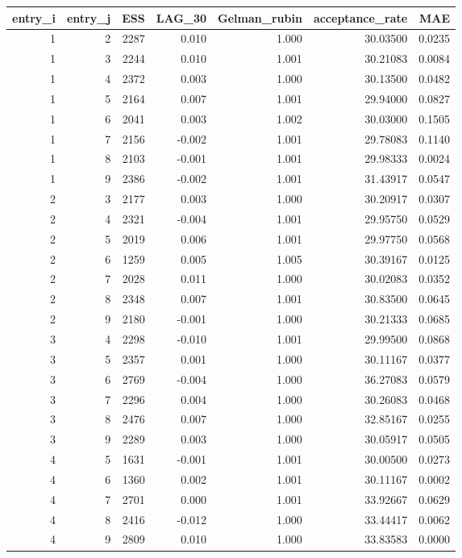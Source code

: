\begin{longtable}{rrrrrrr}
\toprule
entry\_i & entry\_j & ESS & LAG\_30 & Gelman\_rubin & acceptance\_rate & MAE \\ 
\midrule
1 & 2 & 2287 & 0.010 & 1.000 & 30.03500 & 0.0235 \\ 
1 & 3 & 2244 & 0.010 & 1.001 & 30.21083 & 0.0084 \\ 
1 & 4 & 2372 & 0.003 & 1.000 & 30.13500 & 0.0482 \\ 
1 & 5 & 2164 & 0.007 & 1.001 & 29.94000 & 0.0827 \\ 
1 & 6 & 2041 & 0.003 & 1.002 & 30.03000 & 0.1505 \\ 
1 & 7 & 2156 & -0.002 & 1.001 & 29.78083 & 0.1140 \\ 
1 & 8 & 2103 & -0.001 & 1.001 & 29.98333 & 0.0024 \\ 
1 & 9 & 2386 & -0.002 & 1.001 & 31.43917 & 0.0547 \\ 
2 & 3 & 2177 & 0.003 & 1.000 & 30.20917 & 0.0307 \\ 
2 & 4 & 2321 & -0.004 & 1.001 & 29.95750 & 0.0529 \\ 
2 & 5 & 2019 & 0.006 & 1.001 & 29.97750 & 0.0568 \\ 
2 & 6 & 1259 & 0.005 & 1.005 & 30.39167 & 0.0125 \\ 
2 & 7 & 2028 & 0.011 & 1.000 & 30.02083 & 0.0352 \\ 
2 & 8 & 2348 & 0.007 & 1.001 & 30.83500 & 0.0645 \\ 
2 & 9 & 2180 & -0.001 & 1.000 & 30.21333 & 0.0685 \\ 
3 & 4 & 2298 & -0.010 & 1.001 & 29.99500 & 0.0868 \\ 
3 & 5 & 2357 & 0.001 & 1.000 & 30.11167 & 0.0377 \\ 
3 & 6 & 2769 & -0.004 & 1.000 & 36.27083 & 0.0579 \\ 
3 & 7 & 2296 & 0.004 & 1.000 & 30.26083 & 0.0468 \\ 
3 & 8 & 2476 & 0.007 & 1.000 & 32.85167 & 0.0255 \\ 
3 & 9 & 2289 & 0.003 & 1.000 & 30.05917 & 0.0505 \\ 
4 & 5 & 1631 & -0.001 & 1.001 & 30.00500 & 0.0273 \\ 
4 & 6 & 1360 & 0.002 & 1.001 & 30.11167 & 0.0002 \\ 
4 & 7 & 2701 & 0.000 & 1.001 & 33.92667 & 0.0629 \\ 
4 & 8 & 2416 & -0.012 & 1.000 & 33.44417 & 0.0062 \\ 
4 & 9 & 2809 & 0.010 & 1.000 & 33.83583 & 0.0000 \\ 

\end{longtable}
